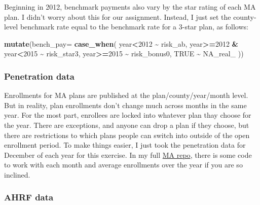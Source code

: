 \documentclass[
  12pt,
]{article}
\newenvironment{Shaded}{\begin{snugshade}}{\end{snugshade}}
\newcommand{\DataTypeTok}[1]{\textcolor[rgb]{0.13,0.29,0.53}{#1}}
\newcommand{\DecValTok}[1]{\textcolor[rgb]{0.00,0.00,0.81}{#1}}
\newcommand{\KeywordTok}[1]{\textcolor[rgb]{0.13,0.29,0.53}{\textbf{#1}}}
\newcommand{\NormalTok}[1]{#1}
\newcommand{\OperatorTok}[1]{\textcolor[rgb]{0.81,0.36,0.00}{\textbf{#1}}}
\newcommand{\OtherTok}[1]{\textcolor[rgb]{0.56,0.35,0.01}{#1}}
\newcommand{\StringTok}[1]{\textcolor[rgb]{0.31,0.60,0.02}{#1}}
\begin{document}
Beginning in 2012, benchmark payments also vary by the star rating of each MA plan. I didn't worry about this for our assignment. Instead, I just set the county-level benchmark rate equal to the benchmark rate for a 3-star plan, as follows:


\begin{Shaded}
\begin{Highlighting}[]
  \KeywordTok{mutate}\NormalTok{(}\DataTypeTok{bench\_pay=}
    \KeywordTok{case\_when}\NormalTok{(}
\NormalTok{      year}\OperatorTok{\textless{}}\DecValTok{2012} \OperatorTok{\textasciitilde{}}\StringTok{ }\NormalTok{risk\_ab,}
\NormalTok{      year}\OperatorTok{\textgreater{}=}\DecValTok{2012} \OperatorTok{\&}\StringTok{ }\NormalTok{year}\OperatorTok{\textless{}}\DecValTok{2015} \OperatorTok{\textasciitilde{}}\StringTok{ }\NormalTok{risk\_star3,}
\NormalTok{      year}\OperatorTok{\textgreater{}=}\DecValTok{2015} \OperatorTok{\textasciitilde{}}\StringTok{ }\NormalTok{risk\_bonus0,}
      \OtherTok{TRUE} \OperatorTok{\textasciitilde{}}\StringTok{ }\OtherTok{NA\_real\_}
\NormalTok{    ))}
\end{Highlighting}
\end{Shaded}


\hypertarget{penetration-data}{%
\subsubsection{Penetration data}\label{penetration-data}}

Enrollments for MA plans are published at the plan/county/year/month level. But in reality, plan enrollments don't change much across months in the same year. For the most part, enrollees are locked into whatever plan thay choose for the year. There are exceptions, and anyone can drop a plan if they choose, but there are restrictions to which plans people can switch into outside of the open enrollment period. To make things easier, I just took the penetration data for December of each year for this exercise. In my full \href{https://github.com/imccart/Medicare-Advantage}{MA repo}, there is some code to work with each month and average enrollments over the year if you are so inclined.

\hypertarget{ahrf-data}{%
\subsubsection{AHRF data}\label{ahrf-data}}
\end{document}
